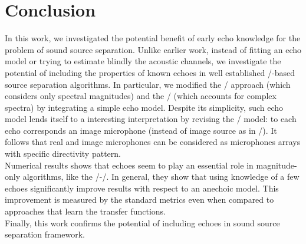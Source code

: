 
\section{Conclusion}
In this work, we investigated the potential benefit of early echo knowledge for the problem of sound source separation.
Unlike earlier work, instead of fitting an echo model or trying to estimate blindly the acoustic channels,
we investigate the potential of including the properties of known echoes in well established \NMF/-based source separation algorithms.
In particular, we modified the \MU/ approach (which considers only spectral magnitudes) and the \EM/ (which accounts for complex spectra) by integrating a simple echo model.
Despite its simplicity, such echo model lends itself to a interesting interpretation by revising the \ISM/ model:
to each echo corresponds an image microphone (instead of image source as in \ISM/).
It follows that real and image microphones can be considered as microphones arrays with specific directivity pattern.
\\Numerical results shows that echoes seem to play an essential role in magnitude-only algorithms, like the \MU/-\NMF/.
In general, they show that using knowledge of a few echoes significantly improve results with respect to an anechoic model.
This improvement is measured by the standard metrics even when compared to approaches that learn the transfer functions.
\\Finally, this work confirms the potential of including echoes in sound source separation framework.

